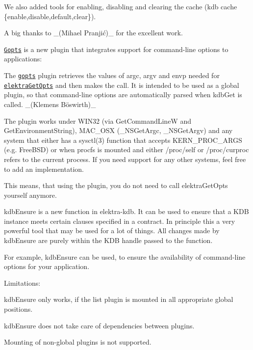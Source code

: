We also added tools for enabling, disabling and clearing the cache ({\ttfamily kdb cache \{enable,disable,default,clear\}}).

A big thanks to \+\_\+(Mihael Pranjić)\+\_\+ for the excellent work.

\href{https://www.libelektra.org/plugins/gopts}{\tt Gopts} is a new plugin that integrates support for command-\/line options to applications\+:


\begin{DoxyItemize}
\item The \href{https://www.libelektra.org/plugins/gopts}{\tt gopts} plugin retrieves the values of {\ttfamily argc}, {\ttfamily argv} and {\ttfamily envp} needed for \href{https://www.libelektra.org/tutorials/command-line-options}{\tt {\ttfamily elektra\+Get\+Opts}} and then makes the call. It is intended to be used as a global plugin, so that command-\/line options are automatically parsed when {\ttfamily kdb\+Get} is called. \+\_\+(Klemens Böswirth)\+\_\+
\item The plugin works under W\+I\+N32 (via {\ttfamily Get\+Command\+LineW} and {\ttfamily Get\+Environment\+String}), M\+A\+C\+\_\+\+O\+SX ({\ttfamily \+\_\+\+N\+S\+Get\+Argc}, {\ttfamily \+\_\+\+N\+S\+Get\+Argv}) and any system that either has a {\ttfamily sysctl(3)} function that accepts {\ttfamily K\+E\+R\+N\+\_\+\+P\+R\+O\+C\+\_\+\+A\+R\+GS} (e.\+g. Free\+B\+SD) or when {\ttfamily procfs} is mounted and either {\ttfamily /proc/self} or {\ttfamily /proc/curproc} refers to the current process. If you need support for any other systems, feel free to add an implementation.
\end{DoxyItemize}

This means, that using the plugin, you do not need to call {\ttfamily elektra\+Get\+Opts} yourself anymore.

{\ttfamily kdb\+Ensure} is a new function in {\ttfamily elektra-\/kdb}. It can be used to ensure that a K\+DB instance meets certain clauses specified in a contract. In principle this a very powerful tool that may be used for a lot of things. All changes made by {\ttfamily kdb\+Ensure} are purely within the K\+DB handle passed to the function.

For example, {\ttfamily kdb\+Ensure} can be used, to ensure the availability of command-\/line options for your application.

Limitations\+:


\begin{DoxyItemize}
\item {\ttfamily kdb\+Ensure} only works, if the {\ttfamily list} plugin is mounted in all appropriate global positions.
\item {\ttfamily kdb\+Ensure} does not take care of dependencies between plugins.
\item Mounting of non-\/global plugins is not supported.
\end{DoxyItemize}

